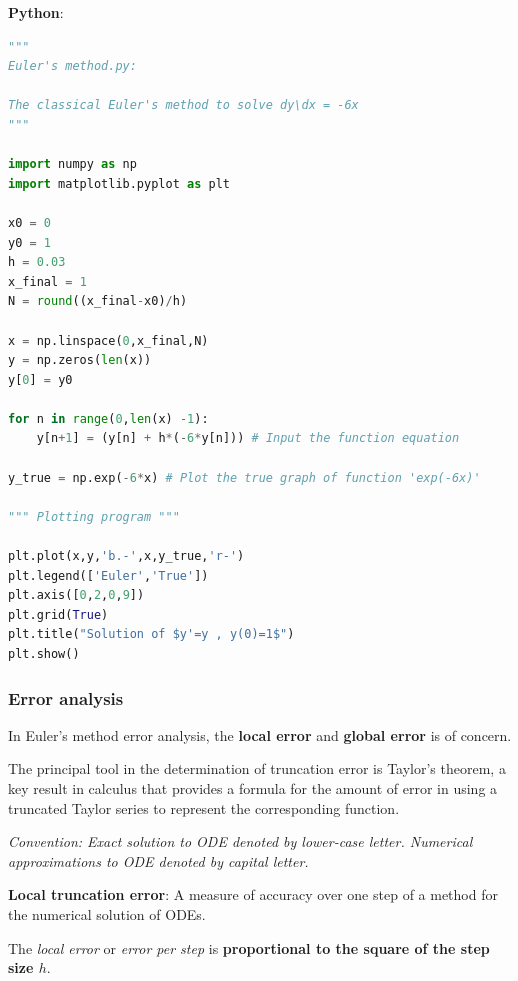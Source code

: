 \documentclass[10pt,a4paper]{article}
\begin{document}
\textbf{Python}: 
\begin{lstlisting}[caption=Euler's Method: Python code, language=Python, numbers=none]
"""
Euler's method.py:

The classical Euler's method to solve dy\dx = -6x
"""

import numpy as np
import matplotlib.pyplot as plt

x0 = 0
y0 = 1
h = 0.03
x_final = 1
N = round((x_final-x0)/h)

x = np.linspace(0,x_final,N) 
y = np.zeros(len(x)) 
y[0] = y0

for n in range(0,len(x) -1): 
    y[n+1] = (y[n] + h*(-6*y[n])) # Input the function equation

y_true = np.exp(-6*x) # Plot the true graph of function 'exp(-6x)'

""" Plotting program """

plt.plot(x,y,'b.-',x,y_true,'r-')
plt.legend(['Euler','True'])
plt.axis([0,2,0,9])
plt.grid(True)
plt.title("Solution of $y'=y , y(0)=1$")
plt.show()
\end{lstlisting}




\subsubsection{Error analysis}

In Euler's method error analysis, the \textbf{local error} and \textbf{global error} is of concern.

The principal tool in the determination of truncation error is Taylor’s theorem, a key result in
calculus that provides a formula for the amount of error in using a truncated Taylor series to
represent the corresponding function.

\begin{center}
    \textit{Convention: Exact solution to ODE denoted by lower-case letter. Numerical approximations to ODE denoted by capital letter.}
\end{center}

\begin{tcolorbox}[breakable,colback=white]
    \textbf{Local truncation error}: A measure of accuracy over one step of a method for the numerical
    solution of ODEs.
\end{tcolorbox}

The \textit{local error} or \textit{error per step} is \textbf{proportional to the square of the
step size $h$}. 
\end{document}
